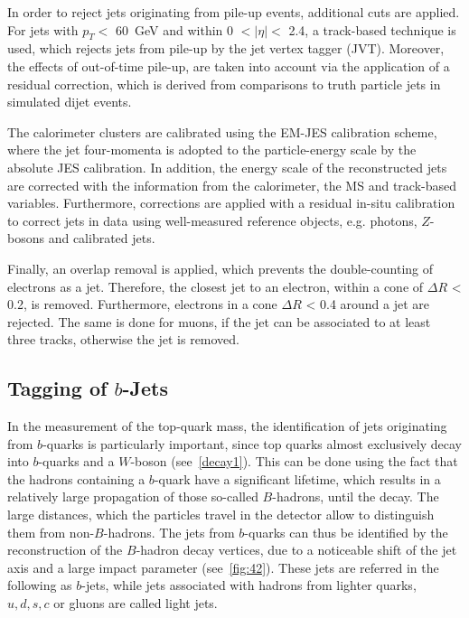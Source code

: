  In order to reject jets originating from pile-up events,  additional cuts are applied. For jets with  $p_T <$ 60~GeV and within  0 $<\mid \eta \mid<$ 2.4,  a track-based technique is used, which rejects  jets from pile-up by the jet vertex tagger (JVT). Moreover, the effects of out-of-time pile-up, are taken into account via the application of  a residual correction, which is derived from comparisons to truth particle jets in simulated dijet events.~\cite{Aad:2015ina}


 The calorimeter clusters are calibrated using the EM-JES calibration scheme, where the jet four-momenta is adopted to the particle-energy scale by the absolute JES calibration. In addition, the energy scale of the reconstructed jets are corrected with the information from the calorimeter, the MS and track-based variables. Furthermore, corrections are applied with a residual in-situ calibration to correct jets in data using well-measured reference objects, e.g.  photons, $Z$-bosons and calibrated jets.~\cite{Aaboud:2017jcu}

 Finally, an overlap removal is applied, which prevents the double-counting of electrons as a jet. Therefore, the closest jet  to an electron, within a cone of $\Delta R $ < 0.2, is removed. Furthermore, electrons in a cone $\Delta R $ < 0.4 around a jet are rejected. The same is done for muons, if the jet can be associated to at least three tracks, otherwise the jet is removed.



\subsection{Tagging of $b$-Jets}
In the measurement of the top-quark mass, the identification of jets originating from $b$-quarks is particularly important, since  top quarks almost exclusively decay into $b$-quarks and a $W$-boson (see~\cref{decay1}). This can be done using the fact that the hadrons containing a $b$-quark have a significant  lifetime, which results in a relatively large propagation of those so-called $B$-hadrons, until the decay. The  large distances, which the particles travel in the detector allow to distinguish them from non-$B$-hadrons.   
The  jets  from $b$-quarks can thus be identified by the reconstruction of the $B$-hadron decay vertices, due to a noticeable shift of the  jet axis and a large impact parameter (see~\cref{fig:42}). These jets are referred in the following as $b$-jets, while jets associated with hadrons from lighter quarks, $u, d, s, c$ or gluons are called light jets.


